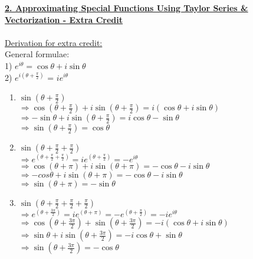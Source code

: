 \documentclass[12pt,letterpaper]{article}
\begin{document}
\underline{\textbf{2. Approximating Special Functions Using Taylor Series \& Vectorization - Extra Credit}} \\\\
\underline{Derivation for extra credit:}  \\
General formulae: \\
1) $e^{i\theta} = \cos{\theta} +  i\sin{\theta}$ \\
2) $e^{i(\theta + \frac{\pi}{2})}$ =  $ie^{i\theta}$
\begin{enumerate}
    \item $\sin{(\theta + \frac{\pi}{2})}$ \\
    $\Rightarrow \cos{(\theta + \frac{\pi}{2})} + i\sin{(\theta + \frac{\pi}{2})} = i(\cos{\theta} + i\sin{\theta}) $ \\
    $\Rightarrow -\sin{\theta} + i\sin{(\theta + \frac{\pi}{2})} = i\cos{\theta} - \sin{\theta} $ \\
    $\Rightarrow \sin{(\theta + \frac{\pi}{2})} = \cos{\theta}$
    
    \item $\sin{(\theta + \frac{\pi}{2} + \frac{\pi}{2})}$ \\ 
    $\Rightarrow e^{(\theta +  \frac{\pi}{2} +  \frac{\pi}{2})} = ie^{(\theta + \frac{\pi}{2}) } = -e^{i\theta}$ \\
    $\Rightarrow \cos{(\theta + \pi )} + i\sin{(\theta + \pi)} = -\cos{\theta}  -i\sin{\theta}$ \\
    $\Rightarrow -cos{\theta} + i\sin{(\theta + \pi)} = -\cos{\theta}  -i\sin{\theta}$\\
    $\Rightarrow \sin{(\theta + \pi)}  = -\sin{\theta}$
    
    \item $\sin{(\theta + \frac{\pi}{2} + \frac{\pi}{2} +\frac{\pi}{2} )}$\\
    $\Rightarrow e^{(\theta + \frac{3\pi}{2})} = ie^{(\theta + \pi)} = -e^{(\theta + \frac{\pi}{2})} = -ie^{i\theta}$ \\
    $\Rightarrow \cos{(\theta + \frac{3\pi}{2})} +  \sin{(\theta + \frac{3\pi}{2})} = -i(\cos{\theta} + i\sin{\theta}) $ \\
    $\Rightarrow \sin{\theta} + i\sin{(\theta + \frac{3\pi}{2})} = -i\cos{\theta} + \sin{\theta}$ \\
    $\Rightarrow \sin{(\theta + \frac{3\pi}{2})} = -\cos{\theta}$
    
    
\end{enumerate}
\end{document}
